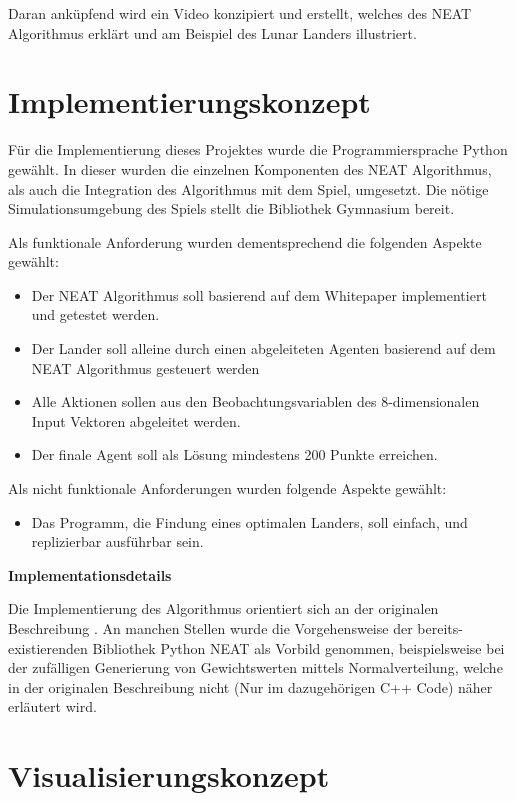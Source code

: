 Daran anküpfend wird ein Video konzipiert und erstellt, welches des NEAT Algorithmus erklärt und am Beispiel des Lunar Landers illustriert.

\section{Implementierungskonzept}
Für die Implementierung dieses Projektes wurde die Programmiersprache Python gewählt. In dieser wurden die einzelnen Komponenten des NEAT Algorithmus, als auch die Integration des Algorithmus mit dem Spiel,  umgesetzt. Die nötige Simulationsumgebung des Spiels stellt die Bibliothek Gymnasium \cite{gymnasiumbib} bereit.

Als funktionale Anforderung wurden dementsprechend die folgenden Aspekte gewählt:
\begin{itemize}
	\item Der NEAT Algorithmus soll basierend auf dem Whitepaper implementiert und getestet werden.
	\item Der Lander soll alleine durch einen abgeleiteten Agenten basierend auf dem NEAT Algorithmus gesteuert werden
	\item Alle Aktionen sollen aus den Beobachtungsvariablen des 8-dimensionalen Input Vektoren abgeleitet werden.
	\item Der finale Agent soll als Lösung mindestens 200  Punkte erreichen. \cite{gymnasiumdoc}
\end{itemize}

Als nicht funktionale Anforderungen wurden folgende Aspekte gewählt:
\begin{itemize}
	\item Das Programm, die Findung eines optimalen Landers, soll einfach, und replizierbar ausführbar sein.
\end{itemize}

\textbf{Implementationsdetails} 

Die Implementierung des Algorithmus orientiert sich an der originalen Beschreibung \cite{NEAT}. An manchen Stellen wurde die Vorgehensweise der bereits-existierenden Bibliothek Python NEAT \cite{pythonneat} als Vorbild genommen, beispielsweise bei der zufälligen Generierung von Gewichtswerten mittels Normalverteilung, welche in der originalen Beschreibung nicht (Nur im dazugehörigen C++ Code) näher erläutert wird. 


\section{Visualisierungskonzept}

